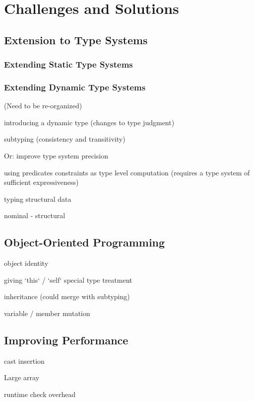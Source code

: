 
\renewcommand{\thechapter}{3}

\chapter{Challenges and Solutions}

\section{Extension to Type Systems}

\subsection{Extending Static Type Systems}

\subsection{Extending Dynamic Type Systems}

(Need to be re-organized)

introducing a dynamic type (changes to type judgment)

subtyping (consistency and transitivity)

Or: improve type system precision

using predicates
constraints as type level computation (requires a type system of sufficient expressiveness)

typing structural data

nominal
- structural

\section{Object-Oriented Programming}

object identity

giving `this` / `self` special type treatment

inheritance (could merge with subtyping)

variable / member mutation

\section{Improving Performance}

cast insertion

Large array

runtime check overhead

